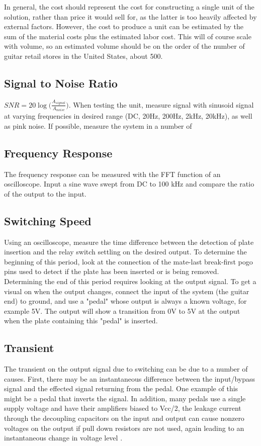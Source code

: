 \documentclass{article}
\begin{document}
	In general, the cost should represent the cost for constructing a single unit of the solution, rather than price it would sell for, as the latter is too heavily affected by external factors.  However, the cost to produce a unit can be estimated by the sum of the material costs plus the estimated labor cost.  This will of course scale with volume, so an estimated volume should be on the order of the number of guitar retail stores in the United States, about 500.

	\subsection{Signal to Noise Ratio}
	$SNR = 20 \log \big( \frac{A_{signal}}{A_{noise}} \big)$.  When testing the unit, measure signal with sinusoid signal at varying frequencies in desired range (DC, 20Hz, 200Hz, 2kHz, 20kHz), as well as pink noise.  If possible, measure the system in a number of 

	\subsection{Frequency Response}
	The frequency response can be measured with the FFT function of an oscilloscope.  Input a sine wave swept from DC to 100 kHz and compare the ratio of the output to the input.

	\subsection{Switching Speed}
	Using an oscilloscope, measure the time difference between the detection of plate insertion and the relay switch settling on the desired output.  To determine the beginning of this period, look at the connection of the mate-last break-first pogo pins used to detect if the plate has been inserted or is being removed.  Determining the end of this period requires looking at the output signal.  To get a visual on when the output changes, connect the input of the system (the guitar end) to ground, and use a "pedal" whose output is always a known voltage, for example 5V.  The output will show a transition from 0V to 5V at the output when the plate containing this "pedal" is inserted.

	\subsection{Transient}
	The transient on the output signal due to switching can be due to a number of causes.  First, there may be an instantaneous difference between the input/bypass signal and the effected signal returning from the pedal.  One example of this might be a pedal that inverts the signal.  In addition, many pedals use a single supply voltage and have their amplifiers biased to Vcc/2, the leakage current through the decoupling capacitors on the input and output can cause nonzero voltages on the output if pull down resistors are not used, again leading to an instantaneous change in voltage level \cite{JackOrman}.
\end{document}
